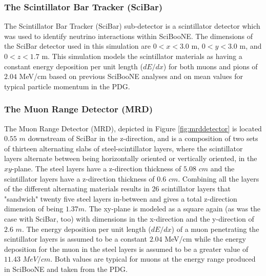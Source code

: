 \documentclass[11pt]{article}
\begin{document}
\subsubsection{The Scintillator Bar Tracker (SciBar)} \label{subsubsec:SciBar}
The Scintillator Bar Tracker (SciBar) sub-detector is a scintillator detector which was used to identify neutrino interactions within SciBooNE. The dimensions of the SciBar detector used in this simulation are $0 < x < 3.0$ m, $0 < y < 3.0$ m, and $0 < z < 1.7$ m. This simulation models the scintillator materials as having a constant energy deposition per unit length ($dE/dx$) for both muons and pions of $2.04$ MeV/cm based on previous SciBooNE analyses and on mean values for typical particle momentum in the PDG.

\subsubsection{The Muon Range Detector (MRD)}\label{subsubsec:MRD}
The Muon Range Detector (MRD), depicted in Figure \ref*{fig:mrddetector} is located $0.55$ $m$ downstream of SciBar in the z-direction, and is a composition of two sets of thirteen alternating slabs of steel-scintillator layers, where the scintillator layers alternate between being horizontally oriented or vertically oriented, in the $xy$-plane. The steel layers have a z-direction thickness of $5.08$ $cm$ and the scintillator layers have a z-direction thickness of $0.6$ $cm$. Combining all the layers of the different alternating materials results in 26 scintillator layers that "sandwich" twenty five steel layers in-between and gives a total z-direction dimension of being $1.37 m$. The xy-plane is modeled as a square again (as was the case with SciBar, too) with dimensions in the x-direction and the y-direction of $2.6$ $m$. The energy deposition per unit length ($dE/dx$) of a muon penetrating the scintillator layers is assumed to be a constant $2.04$ MeV/cm while the energy deposition for the muon in the steel layers is assumed to be a greater value of $11.43$ $MeV/cm$. Both values are typical for muons at the energy range produced in SciBooNE and taken from the PDG.
\end{document}
